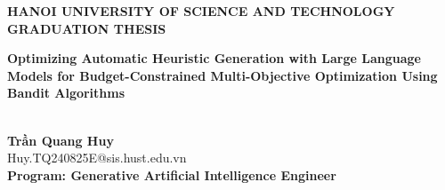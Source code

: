 \documentclass[main.tex]{subfiles}
\begin{document}
\begin{titlepage}
\thispagestyle{empty}
\begin{center}

{\textbf{\large{HANOI UNIVERSITY OF SCIENCE AND TECHNOLOGY}}}\\[4cm]

{\textbf{\huge{GRADUATION THESIS}}}\\[1.0cm]
{\parbox{0.92\textwidth}{\centering\textbf{\Large{Optimizing Automatic Heuristic Generation with Large Language Models for Budget-Constrained Multi-Objective Optimization Using Bandit Algorithms}}}}\\[1.0cm]

{\textbf{\large{Trần Quang Huy}}}\\
{\large{Huy.TQ240825E@sis.hust.edu.vn}}\\[0.4cm]
{\textbf{\large{Program: Generative Artificial Intelligence Engineer}}}\\

\vspace{3.0cm}
\begin{table}[H]
\centering
{}
\end{table}
\end{center}
\end{titlepage}
\end{document}
